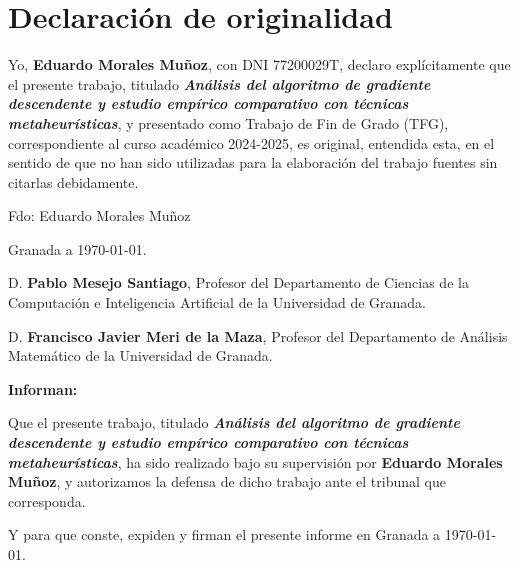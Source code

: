 
\section*{Declaración de originalidad}

Yo, \textbf{Eduardo Morales Muñoz}, con DNI 77200029T, declaro explícitamente que el presente trabajo, titulado \textit{\textbf{Análisis del algoritmo de gradiente descendente y estudio empírico comparativo con técnicas metaheurísticas}}, y presentado como Trabajo de Fin de Grado (TFG), correspondiente al curso académico 2024-2025, es original, entendida esta, en el sentido de que no han sido utilizadas para la elaboración del trabajo fuentes sin citarlas debidamente.

\vspace{6cm}

\noindent Fdo: Eduardo Morales Muñoz

\vspace{2cm}

\begin{flushright}
Granada a \today.
\end{flushright}

\newpage


D. \textbf{Pablo Mesejo Santiago}, Profesor del Departamento de Ciencias de la Computación e Inteligencia Artificial de la Universidad de Granada.

\vspace{0.5cm}

D. \textbf{Francisco Javier Meri de la Maza}, Profesor del Departamento de Análisis Matemático de la Universidad de Granada.


\vspace{0.5cm}

\textbf{Informan:}

\vspace{0.5cm}

Que el presente trabajo, titulado \textit{\textbf{Análisis del algoritmo de gradiente descendente y estudio empírico comparativo con técnicas metaheurísticas}},
ha sido realizado bajo su supervisión por \textbf{Eduardo Morales Muñoz}, y autorizamos la defensa de dicho trabajo ante el tribunal que corresponda.

\vspace{0.5cm}

Y para que conste, expiden y firman el presente informe en Granada a \today.

